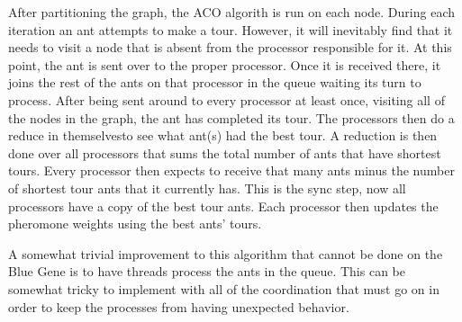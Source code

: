 \documentclass{acm_proc_article-sp}
\begin{document}
After partitioning the graph, the ACO algorith is run on each node. During each iteration an ant attempts to make a tour. 
However, it will inevitably find that it needs to visit a node that is absent from the processor responsible for it. 
At this point, the ant is sent over to the proper processor. Once it is received there, it joins the rest of the ants
on that processor in the queue waiting its turn to process. After being sent around to every processor at least once, visiting
all of the nodes in the graph, the ant has completed its tour. The processors then do a reduce in themselvesto see what ant(s)
had the best tour. A reduction is then done over all processors that sums the total number of ants that have shortest tours.
Every processor then expects to receive that many ants minus the number of shortest tour ants that it currently has. This is the
sync step, now all processors have a copy of the best tour ants. Each processor then updates the pheromone weights using 
the best ants' tours. 

A somewhat trivial improvement to this algorithm that cannot be done on the Blue Gene is to have threads process the ants in the queue.
This can be somewhat tricky to implement with all of the coordination that must go on in order to keep the processes from having
unexpected behavior. 
\end{document}
